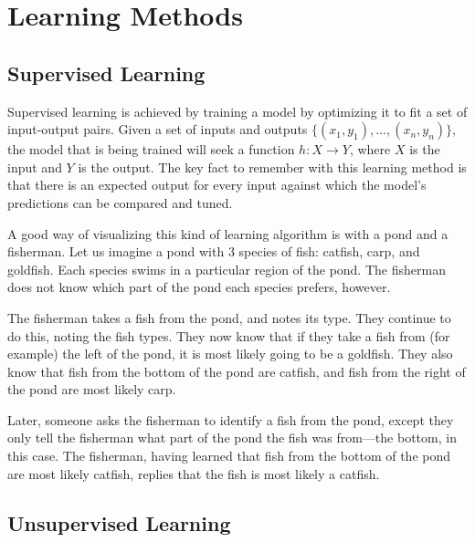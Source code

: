 \documentclass[a4paper]{comjnl}
\numberwithin{equation}{subsection}
\begin{document}

    \section{Learning Methods}\label{sec:learn}

        \subsection{Supervised Learning}\label{sec:sup}

            Supervised learning is achieved by training a model by optimizing it to fit a set of
            input-output pairs. Given a set of inputs and outputs $\{(x_1,y_1),...,(x_n,y_n)\}$,
            the model that is being trained will seek a function $h : X \to Y$, where $X$ is the
            input and $Y$ is the output. The key fact to remember with this learning method is that
            there is an expected output for every input against which the model's predictions can be
            compared and tuned.

            A good way of visualizing this kind of learning algorithm is with a pond and a fisherman.
            Let us imagine a pond with 3 species of fish: catfish, carp, and goldfish. Each species
            swims in a particular region of the pond. The fisherman does not know which part of the
            pond each species prefers, however.

            The fisherman takes a fish from the pond, and notes its type. They continue to do this,
            noting the fish types. They now know that if they take a fish from (for example) the
            left of the pond, it is most likely going to be a goldfish. They also know that fish
            from the bottom of the pond are catfish, and fish from the right of the pond are most
            likely carp.

            Later, someone asks the fisherman to identify a fish from the pond, except they only
            tell the fisherman what part of the pond the fish was from---the bottom, in this case.
            The fisherman, having learned that fish from the bottom of the pond are most likely
            catfish, replies that the fish is most likely a catfish.

        \subsection{Unsupervised Learning}\label{sec:unsup}
\end{document}
